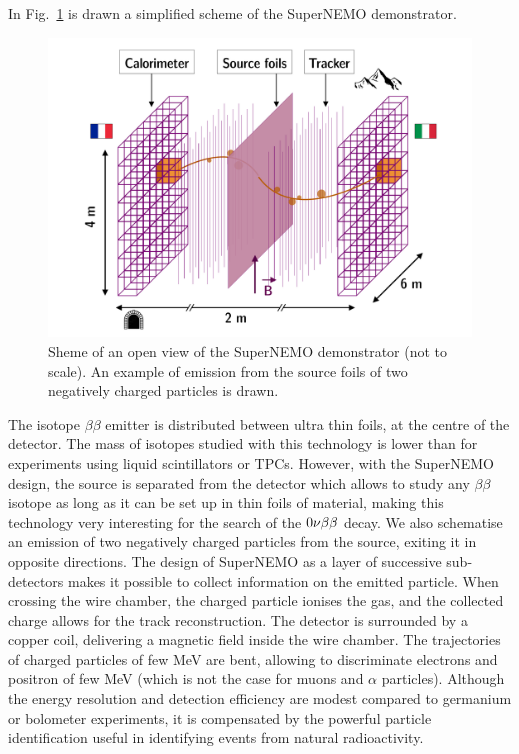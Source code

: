 In Fig.~\ref{fig:demonstrator_scheme} is drawn a simplified scheme of the SuperNEMO demonstrator.
\begin{figure}[h!]
\centering
\includegraphics[width=1\textwidth]{SNdemonstrator/fig_SNdemonstrator/demonstrator_sheme.pdf}
\caption{Sheme of an open view of the SuperNEMO demonstrator (not to scale).
An example of emission from the source foils of two negatively charged particles is drawn.
\label{fig:demonstrator_scheme}}
\end{figure}
The isotope $\beta\beta$ emitter is distributed between ultra thin foils, at the centre of the detector.
The mass of isotopes studied with this technology is lower than for experiments using liquid scintillators or TPCs.
However, with the SuperNEMO design, the source is separated from the detector which allows to study any $\beta\beta$ isotope as long as it can be set up in thin foils of material, making this technology very interesting for the search of the $0\nu\beta\beta$ decay.
We also schematise an emission of two negatively charged particles from the source, exiting it in opposite directions.
The design of SuperNEMO as a layer of successive sub-detectors makes it possible to collect information on the emitted particle.
When crossing the wire chamber, the charged particle ionises the gas, and the collected charge allows for the track reconstruction.
The detector is surrounded by a copper coil, delivering a magnetic field inside the wire chamber.
The trajectories of charged particles of few MeV are bent, allowing to discriminate electrons and positron of few MeV (which is not the case for muons and $\alpha$ particles).
Although the energy resolution and detection efficiency are modest compared to germanium or bolometer experiments, it is compensated by the powerful particle identification useful in identifying events from natural radioactivity.
